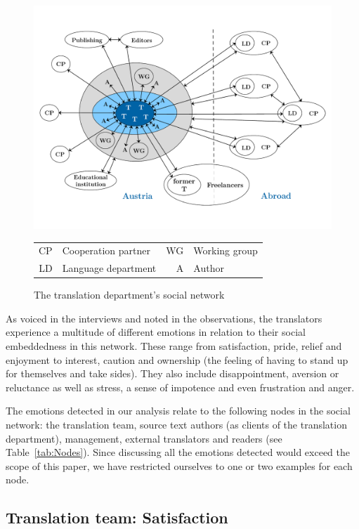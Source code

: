 \documentclass[output=paper]{langscibook}
\begin{document}
\begin{figure}
\includegraphics[width=1\textwidth]{figures/SocialNetwork.pdf}
\caption{The translation department's social network\label{fig:socialnetwork}}
\small
\begin{tabular}{r@{: }l r@{: }l}
CP& Cooperation partner & WG& Working group\\
LD& Language department & A& Author 
\end{tabular}
\end{figure}

As voiced in the interviews and noted in the observations, the translators experience a multitude of different emotions in relation to their social embeddedness in this network. These range from satisfaction, pride, relief and enjoyment to interest, caution and ownership (the feeling of having to stand up for themselves and take sides). They also include disappointment, aversion or reluctance as well as stress, a sense of impotence and even frustration and anger.

The emotions detected in our analysis relate to the following nodes in the social network: the translation team, source text authors (as clients of the translation department), management, external translators and readers (see Table~\ref{tab:Nodes}). Since discussing all the emotions detected would exceed the scope of this paper, we have restricted ourselves to one or two examples for each node.

\subsection{Translation team: Satisfaction}
\end{document}
